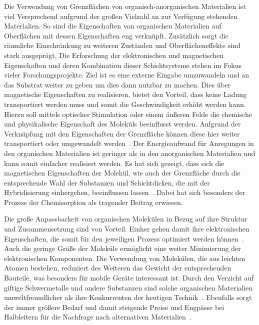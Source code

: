     Die Verwendung von Grenzflächen von organisch-anorganischen Materialien ist viel Versprechend aufgrund der großen Vielzahl an zur Verfügung stehenden Materialien.
    So sind die Eigenschaften von organischen Materialien auf Oberflächen mit dessen Eigenschaften eng verknüpft.
    Zusätzlich sorgt die räumliche Einschränkung zu weiteren Zuständen und Oberflächeneffekte sind stark ausgeprägt.
    Die Erforschung der elektronischen und magnetischen Eigenschaften und deren Kombination dieser Schichtsysteme stehen im Fokus vieler Forschungsprojekte.
    Ziel ist es eine externe Eingabe umzuwandeln und an das Substrat weiter zu geben um dies dann nutzbar zu machen.
    Dies über magnetische Eigenschaften zu realisieren, bietet den Vorteil, dass keine Ladung transportiert werden muss und somit die Geschwindigkeit erhöht werden kann.
    Hierzu soll mittels optischer Stimulation oder einem äußeren Felde die chemische und physikalische Eigenschaft des Moleküls beeinflusst werden.
    Aufgrund der Verknüpfung mit den Eigenschaften der Grenzfläche können diese hier weiter transportiert oder umgewandelt werden~\cite{IF_16}.
    Der Energieaufwand für Anregungen in den organischen Materialien ist geringer als in den anorganischen Materialien und kann somit einfacher realisiert werden.
    Es hat sich gezeigt, dass sich die magnetischen Eigenschaften der Molekül, wie auch der Grenzfläche durch die entsprechende Wahl der Substanzen und Schichtdicken, die mit der Hybridisierung einhergehen, beeinflussen lassen~\cite{IF_16}.
    Dabei hat sich besonders der Prozess der Chemisorption als tragender Beitrag erwiesen.

    Die große Anpassbarkeit von organischen Molekülen in Bezug auf ihre Struktur und Zusammensetzung sind von Vorteil.
    Einher gehen damit ihre elektronischen Eigenschaften, die somit für den jeweiligen Prozess optimiert werden können~\cite{scholl_chapter_2018}.
    Auch die geringe Größe der Moleküle ermöglicht eine weiter Minimierung der elektronischen Komponenten.
    Die Verwendung von Molekülen, die aus leichten Atomen bestehen, reduziert des Weiteren das Gewicht der entsprechenden Bauteile, was besonders für mobile Geräte interessant ist.
    Durch den Verzicht auf giftige Schwermetalle und andere Substanzen sind solche organischen Materialien umweltfreundlicher als ihre Konkurrenten der heutigen Technik~\cite{scholl_chapter_2018}.
    Ebenfalls sorgt der immer größere Bedarf und damit steigende Preise und Engpässe bei Halbleitern für die Nachfrage nach alternativen Materialien~\cite{Idealo}.

